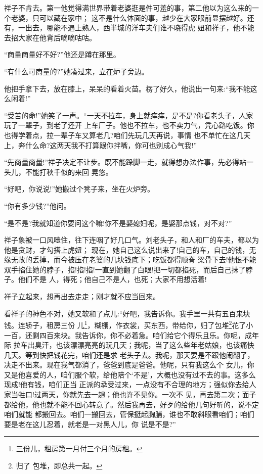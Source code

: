 \documentclass[11pt,a4paper,onecolumn]{article}
\begin{document}
祥子不肯去。第一他觉得满世界带着老婆逛是件可羞的事，第二他以为这么来的一个老婆，只可以藏在家中；
这不是什么体面的事，越少在大家眼前显摆越好。还有，一出去，哪能不遇上熟人，西半城的洋车夫们谁不晓得虎
妞和祥子，他不能去招大家在他背后嘀嘀咕咕。

``商量商量好不好?''他还是蹲在那里。

``有什么可商量的?''她凑过来，立在炉子旁边。

他把手拿下去，放在膝上，呆呆的看着火苗。楞了好久，他说出一句来:``我不能这么闲着!''

``受苦的命!''她笑了一声。``一天不拉车，身上就痒痒，是不是?你看老头子，人家玩了一辈子，到老了还开
上车厂子。他也不拉车，也不卖力气，凭心路吃饭。你也得学着点，拉一辈子车又算老几?咱们先玩几天再说，事情
也不单忙在这几天上，奔什么命?这两天我不打算跟你拌嘴，你可也别成心气我!''

``先商量商量!''祥子决定不让步。既不能跺脚一走，就得想办法作事，先必得站一头儿，不能打秋千似的来回
晃悠。

``好吧，你说说!''她搬过个凳子来，坐在火炉旁。

``你有多少钱?''他问。

``是不是?我就知道你要问这个嘛!你不是娶媳妇呢，是娶那点钱，对不对?''

祥子象被一口风噎住，往下连咽了好几口气。刘老头子，和人和厂的车夫，都以为他是贪财，才勾搭上虎妞；
现在，她自己这么说出来了!自己的车，自己的钱，无缘无故的丢掉，而今被压在老婆的几块钱底下；吃饭都得顺脊
梁骨下去!他恨不能双手掐住她的脖子，掐!掐!掐!一直到她翻了白眼!把一切都掐死，而后自己抹了脖子。他们不是
人，得死；他自己不是人，也死；大家不用想活着!

祥子立起来，想再出去走走；刚才就不应当回来。

看祥子的神色不对，她又软和了点儿:``好吧，我告诉你。我手里一共有五百来块钱。连轿子，租房\myrule 三份
儿\footnote{三份儿，租房第一月付三个月的房租。}，糊棚，作衣裳，买东西，带给你，归了包堆\footnote{归了
  包堆，即总共一起。}花了小一百，还剩四百来块。我告诉你，你不必着急。咱们给它个得乐且乐。你呢，成年际
拉车出臭汗，也该漂漂亮亮的玩几天；我呢，当了这么些年老姑娘，也该痛快几天。等到快把钱花完，咱们还是求
老头子去。我呢，那天要是不跟他闹翻了，决走不出来。现在我气都消了，爸爸到底是爸爸。他呢，只有我这么个
女儿，你又是他喜爱的人，咱们服个软，给他陪个`不是'，大概也没有过不去的事。这多么现成!他有钱，咱们正当
正派的承受过来，一点没有不合理的地方；强似你去给人家当牲口!过两天，你就先去一趟；他也许不见你。一次不
见，再去第二次；面子都给他，他也就不能不回心转意了。然后我再去，好歹的给他几句好听的，说不定咱们就能
都搬回去。咱们一搬回去，管保挺起胸脯，谁也不敢斜眼看咱们；咱们要是老在这儿忍着，就老是一对黑人儿，你
说是不是?''
\end{document}
